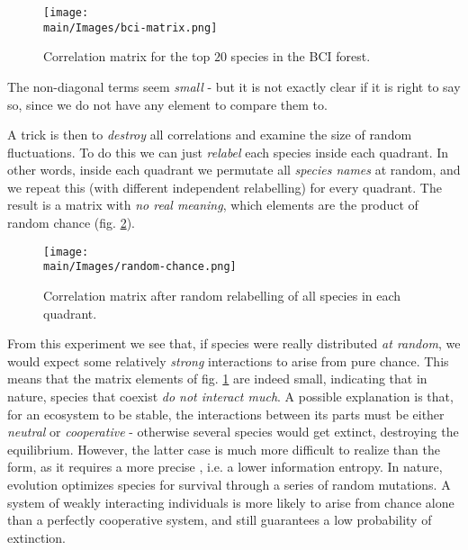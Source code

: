 \documentclass[../../main.tex]{subfiles}
\begin{document}
\begin{figure}[H]
    \centering
    \texttt{[image: \\main/Images/bci-matrix.png]}
    \caption{Correlation matrix for the top $20$ species in the BCI forest.}
    \label{fig:bci-matrix}
\end{figure}

The non-diagonal terms seem \textit{small} - but it is not exactly clear if it is right to say so, since we do not have any element to compare them to.

A trick is then to \textit{destroy} all correlations and examine the size of random fluctuations. To do this we can just \textit{relabel} each species inside each quadrant. In other words, inside each quadrant we permutate all \textit{species names} at random, and we repeat this (with different independent relabelling) for every quadrant. The result is a matrix with \textit{no real meaning}, which elements are the product of random chance (fig. \ref{fig:random-chance}).

\begin{figure}[H]
    \centering
    \texttt{[image: \\main/Images/random-chance.png]}
    \caption{Correlation matrix after random relabelling of all species in each quadrant.}
    \label{fig:random-chance}
\end{figure}

From this experiment we see that, if species were really distributed \textit{at random}, we would expect some relatively \textit{strong} interactions to arise from pure chance. This means that the matrix elements of fig. \ref{fig:bci-matrix} are indeed small, indicating that in nature, species that coexist \textit{do not interact much}. A possible explanation is that, for an ecosystem to be stable, the interactions between its parts must be either \textit{neutral} or \textit{cooperative} - otherwise several species would get extinct, destroying the equilibrium. However, the latter case is much more difficult to realize than the form, as it requires a more precise , i.e. a lower information entropy. In nature, evolution optimizes species for survival through a series of random mutations. A system of weakly interacting individuals is more likely to arise from chance alone than a perfectly cooperative system, and still guarantees a low probability of extinction. 
\end{document}
